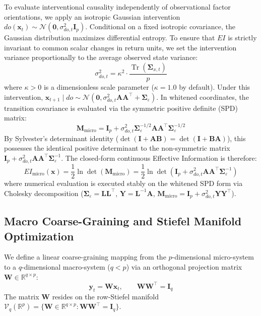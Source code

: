\documentclass[review,12pt,authoryear]{elsarticle}
\begin{document}
To evaluate interventional causality independently of observational factor orientations, we apply an isotropic Gaussian intervention $do(\mathbf{x}_t) \sim \mathcal{N}(\mathbf{0}, \sigma_{do,t}^2 \mathbf{I}_p)$. Conditional on a fixed isotropic covariance, the Gaussian distribution maximizes differential entropy. To ensure that $EI$ is strictly invariant to common scalar changes in return units, we set the intervention variance proportionally to the average observed state variance:
\begin{equation}
\sigma_{do,t}^2 = \kappa^2 \cdot \frac{\operatorname{Tr}(\boldsymbol{\Sigma}_{x,t})}{p}
\label{eq:scale_inv_def}
\end{equation}
where $\kappa > 0$ is a dimensionless scale parameter ($\kappa = 1.0$ by default). Under this intervention, $\mathbf{x}_{t+1} \mid do \sim \mathcal{N}(\mathbf{0}, \sigma_{do,t}^2 \mathbf{A}\mathbf{A}^\top + \boldsymbol{\Sigma}_\varepsilon)$. In whitened coordinates, the transition covariance is evaluated via the symmetric positive definite (SPD) matrix:
\begin{equation}
\mathbf{M}_{\text{micro}} = \mathbf{I}_p + \sigma_{do,t}^2 \boldsymbol{\Sigma}_\varepsilon^{-1/2} \mathbf{A}\mathbf{A}^\top \boldsymbol{\Sigma}_\varepsilon^{-1/2}
\label{eq:m_micro_spd}
\end{equation}
By Sylvester's determinant identity ($\det(\mathbf{I} + \mathbf{A}\mathbf{B}) = \det(\mathbf{I} + \mathbf{B}\mathbf{A})$), this possesses the identical positive determinant to the non-symmetric matrix $\mathbf{I}_p + \sigma_{do,t}^2 \mathbf{A}\mathbf{A}^\top \boldsymbol{\Sigma}_\varepsilon^{-1}$. The closed-form continuous Effective Information is therefore:
\begin{equation}
EI_{\text{micro}}(\mathbf{x}) = \frac{1}{2} \ln \det\left( \mathbf{M}_{\text{micro}} \right) = \frac{1}{2} \ln \det\left( \mathbf{I}_p + \sigma_{do,t}^2 \mathbf{A}\mathbf{A}^\top \boldsymbol{\Sigma}_\varepsilon^{-1} \right)
\label{eq:ei_micro_closed}
\end{equation}
where numerical evaluation is executed stably on the whitened SPD form via Cholesky decomposition ($\boldsymbol{\Sigma}_\varepsilon = \mathbf{L}\mathbf{L}^\top$, $\mathbf{Y} = \mathbf{L}^{-1}\mathbf{A}$, $\mathbf{M}_{\text{micro}} = \mathbf{I}_p + \sigma_{do,t}^2 \mathbf{Y}\mathbf{Y}^\top$).

\subsection{Macro Coarse-Graining and Stiefel Manifold Optimization}
We define a linear coarse-graining mapping from the $p$-dimensional micro-system to a $q$-dimensional macro-system ($q < p$) via an orthogonal projection matrix $\mathbf{W} \in \mathbb{R}^{q \times p}$:
\begin{equation}
\mathbf{y}_t = \mathbf{W}\mathbf{x}_t, \qquad \mathbf{W}\mathbf{W}^\top = \mathbf{I}_q
\end{equation}
The matrix $\mathbf{W}$ resides on the row-Stiefel manifold $\mathcal{V}_q(\mathbb{R}^p) = \{ \mathbf{W} \in \mathbb{R}^{q \times p} : \mathbf{W}\mathbf{W}^\top = \mathbf{I}_q \}$. 
\end{document}
